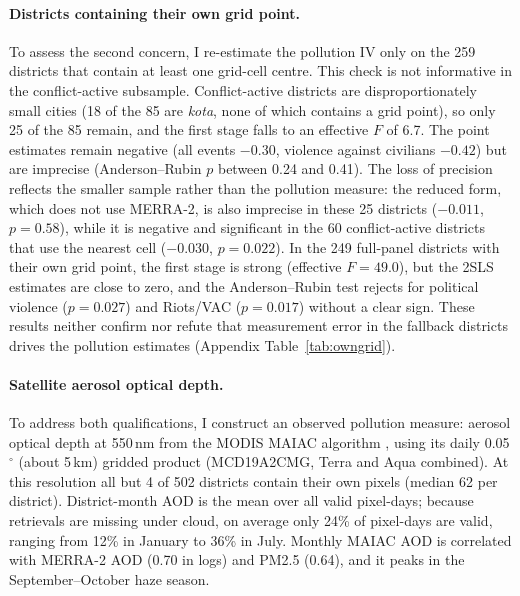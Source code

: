 \documentclass[12pt]{article}
\begin{document}
\paragraph{Districts containing their own grid point.} To assess the second concern, I re-estimate the pollution IV only on the 259 districts that contain at least one grid-cell centre. This check is not informative in the conflict-active subsample. Conflict-active districts are disproportionately small cities (18 of the 85 are \emph{kota}, none of which contains a grid point), so only 25 of the 85 remain, and the first stage falls to an effective $F$ of 6.7. The point estimates remain negative (all events $-0.30$, violence against civilians $-0.42$) but are imprecise (Anderson--Rubin $p$ between 0.24 and 0.41). The loss of precision reflects the smaller sample rather than the pollution measure: the reduced form, which does not use MERRA-2, is also imprecise in these 25 districts ($-0.011$, $p=0.58$), while it is negative and significant in the 60 conflict-active districts that use the nearest cell ($-0.030$, $p=0.022$). In the 249 full-panel districts with their own grid point, the first stage is strong (effective $F = 49.0$), but the 2SLS estimates are close to zero, and the Anderson--Rubin test rejects for political violence ($p=0.027$) and Riots/VAC ($p=0.017$) without a clear sign. These results neither confirm nor refute that measurement error in the fallback districts drives the pollution estimates (Appendix Table~\ref{tab:owngrid}).

\paragraph{Satellite aerosol optical depth.} To address both qualifications, I construct an observed pollution measure: aerosol optical depth at 550\,nm from the MODIS MAIAC algorithm \citep{lyapustin2018maiac}, using its daily 0.05$^{\circ}$ (about 5\,km) gridded product (MCD19A2CMG, Terra and Aqua combined). At this resolution all but 4 of 502 districts contain their own pixels (median 62 per district). District-month AOD is the mean over all valid pixel-days; because retrievals are missing under cloud, on average only 24\% of pixel-days are valid, ranging from 12\% in January to 36\% in July. Monthly MAIAC AOD is correlated with MERRA-2 AOD (0.70 in logs) and PM2.5 (0.64), and it peaks in the September--October haze season.
\end{document}
